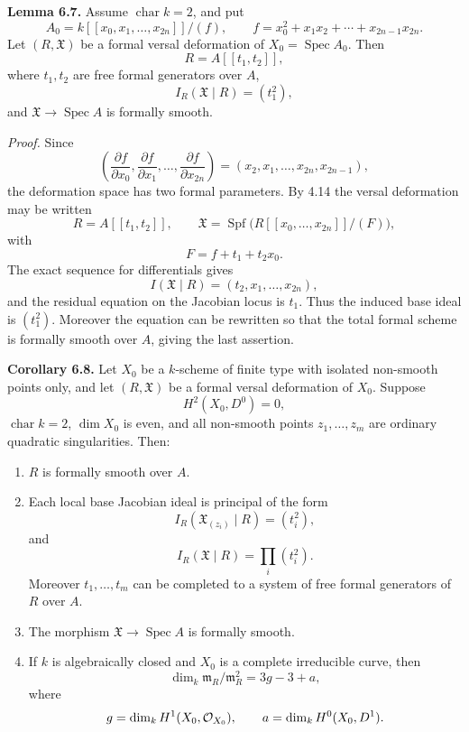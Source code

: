\documentclass[11pt]{article}
\providecommand{\Spec}{\operatorname{Spec}}
\providecommand{\Spf}{\operatorname{Spf}}
\begin{document}
\textbf{Lemma 6.7.}  Assume \(\operatorname{char}k=2\), and put
\[
        A_0=
        k[[x_0,x_1,\ldots,x_{2n}]]/(f),
        \qquad
        f=x_0^2+x_1x_2+\cdots+x_{2n-1}x_{2n}.
\]
Let \((R,\mathfrak X)\) be a formal versal deformation of \(X_0=\Spec A_0\).  Then
\[
        R=A[[t_1,t_2]],
\]
where \(t_1,t_2\) are free formal generators over \(A\),
\[
        I_R(\mathfrak X\mid R)=(t_1^2),
\]
and \(\mathfrak X\to\Spec A\) is formally smooth.

\emph{Proof.}  Since
\[
        \left(\frac{\partial f}{\partial x_0},
        \frac{\partial f}{\partial x_1},\ldots,
        \frac{\partial f}{\partial x_{2n}}\right)
        =
        (x_2,x_1,\ldots,x_{2n},x_{2n-1}),
\]
the deformation space has two formal parameters.  By 4.14 the versal deformation may be written
\[
        R=A[[t_1,t_2]],\qquad
        \mathfrak X=
        \Spf\bigl(R[[x_0,\ldots,x_{2n}]]/(F)\bigr),
\]
with
\[
        F=f+t_1+t_2x_0.
\]
The exact sequence for differentials gives
\[
        I(\mathfrak X\mid R)=(t_2,x_1,\ldots,x_{2n}),
\]
and the residual equation on the Jacobian locus is \(t_1\).  Thus the induced base ideal is \((t_1^2)\).  Moreover the equation can be rewritten so that the total formal scheme is formally smooth over \(A\), giving the last assertion.

\textbf{Corollary 6.8.}  Let \(X_0\) be a \(k\)-scheme of finite type with isolated non-smooth points only, and let \((R,\mathfrak X)\) be a formal versal deformation of \(X_0\).  Suppose
\[
        H^2(X_0,D^0)=0,
\]
\(\operatorname{char}k=2\), \(\dim X_0\) is even, and all non-smooth points \(z_1,\ldots,z_m\) are ordinary quadratic singularities.  Then:
\begin{enumerate}[label=(\arabic*)]
\item \(R\) is formally smooth over \(A\).
\item Each local base Jacobian ideal is principal of the form
\[
        I_R(\mathfrak X_{(z_i)}\mid R)=(t_i^2),
\]
and
\[
        I_R(\mathfrak X\mid R)=\prod_i (t_i^2).
\]
Moreover \(t_1,\ldots,t_m\) can be completed to a system of free formal generators of \(R\) over \(A\).
\item The morphism \(\mathfrak X\to\Spec A\) is formally smooth.
\item If \(k\) is algebraically closed and \(X_0\) is a complete irreducible curve, then
\[
        \dim_k\mathfrak m_R/\mathfrak m_R^2=3g-3+a,
\]
where
\[
        g=\dim_kH^1(X_0,\mathcal O_{X_0}),
        \qquad
        a=\dim_kH^0(X_0,D^1).
\]
\end{enumerate}
\end{document}
